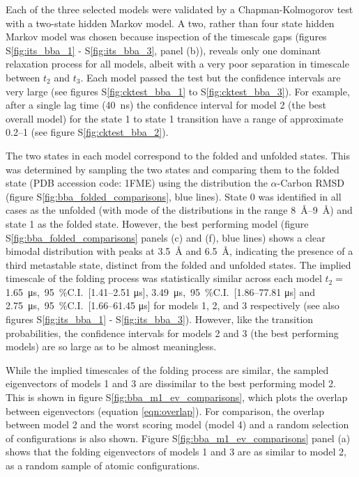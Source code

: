 \documentclass[journal=jacsat,manuscript=article]{achemso}
\newcommand{\SIci}[4]{\SI{#1}{#4},\ \SI{95}{\percent}C.I.\ [\numrange[range-phrase=---]{#2}{#3} \si{#4}]}
\newcommand*\sref[1]{%
    S\ref{#1}}
\begin{document}
Each of the three selected models were validated by a Chapman-Kolmogorov test with a two-state hidden Markov model. A two, rather than four state hidden Markov model was chosen because inspection of the timescale gaps (figures \sref{fig:its_bba_1} - \sref{fig:its_bba_3}, panel (b)), reveals only one dominant relaxation process for all models, albeit with a very poor separation in timescale between $t_2$ and $t_3$. Each model passed the test but the confidence intervals are very large (see figures \sref{fig:cktest_bba_1} to \sref{fig:cktest_bba_3}).  For example, after a single lag time (\SI{40}{\nano\second}) the confidence interval for model 2 (the best overall model) for the state 1 to state 1 transition have a range of approximate \numrange{0.2}{1} (see figure \sref{fig:cktest_bba_2}).

The two states in each model correspond to the folded and unfolded states. This was determined by sampling the two states and comparing them to the folded state (PDB accession code: 1FME) using the distribution the $\alpha$-Carbon RMSD (figure \sref{fig:bba_folded_comparisons}, blue lines).  State 0 was identified in all cases as the unfolded (with mode of the distributions in the range \SIrange{8}{9}{\angstrom}) and state 1 as the folded state. However, the best performing model (figure \sref{fig:bba_folded_comparisons} panels (c) and (f), blue lines) shows a clear bimodal distribution with peaks at \SI{3.5}{\angstrom} and \SI{6.5}{\angstrom}, indicating the presence of a third metastable state, distinct from the folded and unfolded states.   
The implied timescale of the folding process was statistically similar across each model $t_2 =\ $\SIci{ 1.65}{ 1.41}{ 2.51}{\micro\second}, \SIci{ 3.49}{ 1.86}{ 77.81}{\micro\second} and \SIci{ 2.75}{ 1.66}{ 61.45}{\micro\second}  for models 1, 2, and 3 respectively (see also figures \sref{fig:its_bba_1} - \sref{fig:its_bba_3}). However, like the transition probabilities, the confidence intervals for models 2 and 3 (the best performing models) are so large as to be almost meaningless. 

While the implied timescales of the folding process are similar, the sampled eigenvectors of models 1 and 3 are dissimilar to the best performing model 2.  This is shown in figure \sref{fig:bba_m1_ev_comparisons}, which plots the overlap between eigenvectors (equation \ref{eqn:overlap}). For comparison, the overlap between model 2 and the worst scoring model (model 4) and a random selection of configurations is also shown. Figure \sref{fig:bba_m1_ev_comparisons} panel (a) shows that the folding eigenvectors of models 1 and 3 are as similar to model 2, as a random sample of atomic configurations.  
\end{document}
